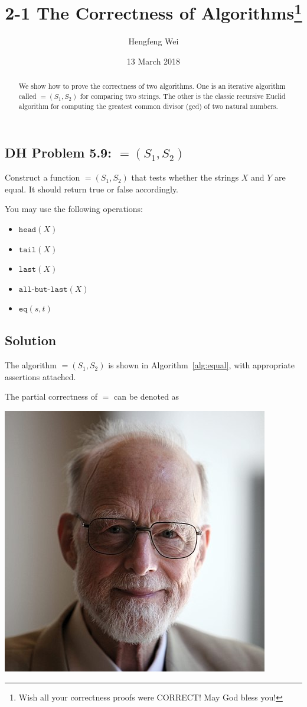 \documentclass{tufte-handout}
\title{2-1 The Correctness of Algorithms\thanks{Wish all your correctness proofs were \uppercase{correct}! May God bless you!}}
\author[hengxin]{Hengfeng Wei}
\date{13 March 2018}  %
\begin{document}
\begin{CJK*}{UTF8}{gbsn}

\maketitle%

\begin{abstract}
\noindent We show how to prove the correctness of two algorithms.
One is an iterative algorithm called $\equal(S_1, S_2)$ for comparing two strings.
The other is the classic recursive Euclid algorithm for 
computing the greatest common divisor (gcd) of two natural numbers.
\end{abstract}


\section{DH Problem 5.9: $\equal(S_1, S_2)$}  \label{section:problem-5.9}
  Construct a function $\equal(S_1, S_2)$ that tests whether the strings $X$ and $Y$ are equal.
  It should return true or false accordingly.

  You may use the following operations:
  \begin{itemize}
    \item $\texttt{head}(X)$
    \item $\texttt{tail}(X)$
    \item $\texttt{last}(X)$
    \item $\texttt{all-but-last}(X)$
    \item $\texttt{eq}(s,t)$
  \end{itemize}

\subsection{Solution}


The algorithm $\equal(S_1, S_2)$ is shown in Algorithm~\ref{alg:equal},
with appropriate assertions attached.

The partial correctness of $\equal$ can be denoted as

\begin{marginfigure}%
  \includegraphics[width=0.60\linewidth]{figs/tony-hoare}
  \label{fig:hoare}
\end{marginfigure}


\end{CJK*}
\end{document}
